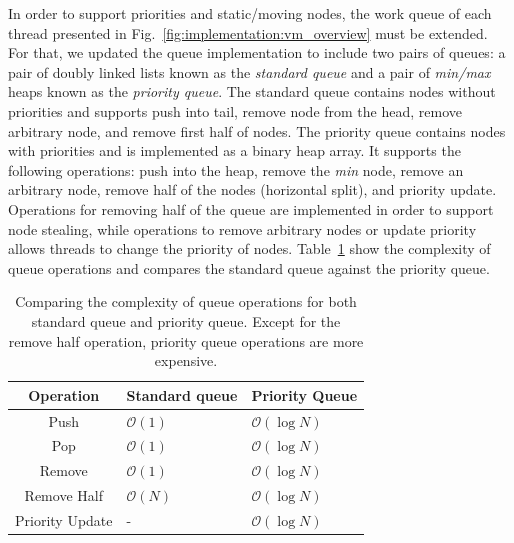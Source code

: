 In order to support priorities and static/moving nodes, the work queue of each
thread presented in Fig.~\ref{fig:implementation:vm_overview} must be extended.
For that, we updated the queue implementation to include two pairs of queues:
a pair of doubly linked lists known as the \emph{standard queue} and a pair of
\emph{min/max} heaps known as the \emph{priority queue}.  The standard queue
contains nodes without priorities and supports push into tail, remove node from
the head, remove arbitrary node, and remove first half of nodes.  The priority
queue contains nodes with priorities and is implemented as a binary heap array.
It supports the following operations: push into the heap, remove the \emph{min}
node, remove an arbitrary node, remove half of the nodes (horizontal split), and
priority update.  Operations for removing half of the queue are implemented in
order to support node stealing, while operations to remove arbitrary nodes or
update priority allows threads to change the priority of nodes.
Table~\ref{fig:implementation:table_queue} show the complexity of queue
operations and compares the standard queue against the priority queue.

\begin{table}[h]
   \begin{tabular}{| c | l | l |}
      \hline
      \textbf{Operation} & \textbf{Standard queue} & \textbf{Priority Queue} \\
      \hline
      Push & $\mathcal{O}(1)$ & $\mathcal{O}(\log{N})$ \\ \hline
      Pop & $\mathcal{O}(1)$ & $\mathcal{O}(\log{N})$ \\ \hline
      Remove & $\mathcal{O}(1)$ & $\mathcal{O}(\log{N})$ \\ \hline
      Remove Half & $\mathcal{O}(N)$ & $\mathcal{O}(\log{N})$ \\ \hline
      Priority Update & - & $\mathcal{O}(\log{N})$ \\ \hline
   \end{tabular}
   \caption{Comparing the complexity of queue operations for both standard
      queue and priority queue. Except for the remove half operation, priority
      queue operations are more expensive.}
   \label{fig:implementation:table_queue}
\end{table}

